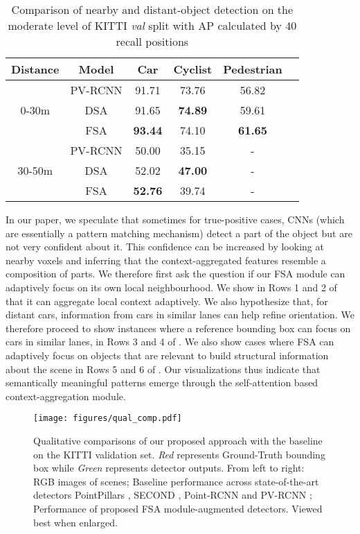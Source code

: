 \documentclass[10pt,twocolumn,letterpaper]{article}
\begin{document}
\setlength{\tabcolsep}{1.4pt} \setlength{\tabcolsep}{4pt}
\begin{table}[h]
\begin{center}
\begin{tabular}{c||c||cccc}
\hline
Distance & Model & Car & Cyclist & Pedestrian \\
\hline
 \multirow{3}{*}{0-30m} & PV-RCNN \cite{PVRCNN} & 91.71 & 73.76 & 56.82 \\ 
  & DSA & 91.65 & \bf{74.89} & 59.61  \\
  & FSA & \bf{93.44} & 74.10 & \textbf{61.65} \\
 \hline
 \multirow{3}{*}{30-50m} & PV-RCNN \cite{PVRCNN} & 50.00 & 35.15 & - \\ 
 & DSA & 52.02 & \bf{47.00} & -  \\
 & FSA & \bf{52.76} & 39.74 & - \\
\hline
\end{tabular}
\end{center}
\caption{Comparison of nearby and distant-object detection on the moderate level of KITTI \textit{val} split with AP calculated by 40 recall positions}
\label{table:distance}
\end{table}
\setlength{\tabcolsep}{1.4pt}
 In our paper, we speculate that sometimes for true-positive cases, CNNs (which are essentially a pattern matching mechanism) detect a part of the object but are not very confident about it. This confidence can be increased by looking at nearby voxels and inferring that the context-aggregated features resemble a composition of parts. We therefore first ask the question if our FSA module can adaptively focus on its own local neighbourhood. We show in Rows 1 and 2 of  that it can aggregate local context adaptively. We also hypothesize that, for distant cars, information from cars in similar lanes can help refine orientation. We therefore proceed to show instances where a reference bounding box can focus on cars in similar lanes, in Rows 3 and 4 of . We also show cases where FSA can adaptively focus on objects that are relevant to build structural information about the scene in Rows 5 and 6 of . Our visualizations thus indicate that semantically meaningful patterns emerge through the self-attention based context-aggregation module.

\begin{figure*}[ht]
    \centering
    \texttt{[image: figures/qual\_comp.pdf]}
    \caption{Qualitative comparisons of our proposed approach with the baseline on the KITTI validation set. \textit{Red} represents Ground-Truth bounding box while \textit{Green} represents detector outputs. From left to right: RGB images of scenes; Baseline performance across state-of-the-art detectors PointPillars \cite{pointpillars}, SECOND \cite{SECOND}, Point-RCNN \cite{PointRCNN} and PV-RCNN \cite{PVRCNN}; Performance of proposed FSA module-augmented detectors. Viewed best when enlarged.}
    \label{fig:qual_compare}
\end{figure*}
\end{document}
